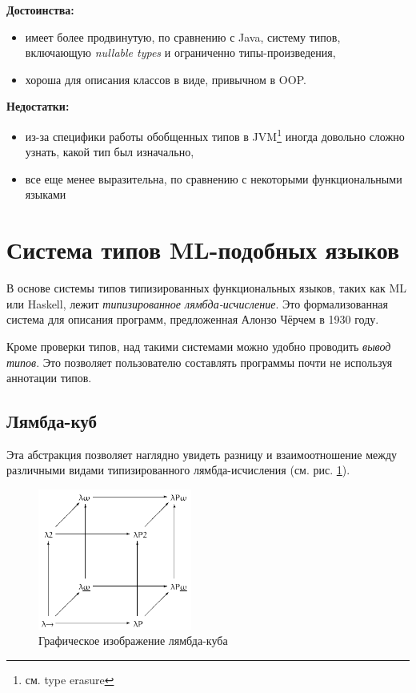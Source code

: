 \textbf{Достоинства:}
\begin{itemize}
    \item имеет более продвинутую, по сравнению с Java, систему типов, включающую \textit{nullable types} и ограниченно типы-произведения,
    \item хороша для описания классов в виде, привычном в \gls{OOP}.
\end{itemize}

\textbf{Недостатки:}
\begin{itemize}
    \item из-за специфики работы обобщенных типов в \gls{JVM}\footnote{см. type erasure} иногда довольно сложно узнать, какой тип был изначально,
    \item все еще менее выразительна, по сравнению с некоторыми функциональными языками
\end{itemize}

\section{Система типов ML-подобных языков}
\label{sec:ml_type_system}

В основе системы типов типизированных функциональных языков, таких как ML или Haskell, лежит \textit{типизированное лямбда-исчисление}.
Это формализованная система для описания программ, предложенная Алонзо Чёрчем в 1930 году.

Кроме проверки типов, над такими системами можно удобно проводить \textit{вывод типов}.
Это позволяет пользователю составлять программы почти не используя аннотации типов.

\subsection{Лямбда-куб}
\label{subsec:lambda_cube}

Эта абстракция позволяет наглядно увидеть разницу и взаимоотношение между различными видами типизированного лямбда-исчисления (см. рис. \ref{fig:lambda_cube}).

\begin{figure}[H]
    \centering
    \includegraphics[width=0.45\textwidth]{figures/Lambda_cube}
    \caption{Графическое изображение лямбда-куба}
    \label{fig:lambda_cube}
\end{figure}

